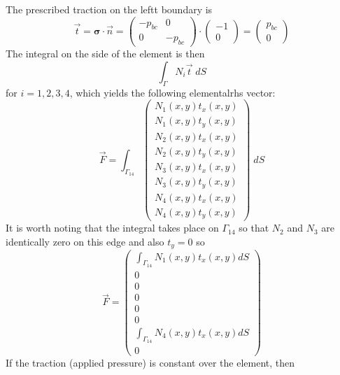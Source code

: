 The prescribed traction on the leftt boundary is
\[
{\vec t}={\bm \sigma}\cdot {\vec n}=
\left(
\begin{array}{cc}
-p_{bc} & 0 \\
0 & -p_{bc}
\end{array}
\right)
\cdot
\left(
\begin{array}{c}
-1 \\ 0
\end{array}
\right)
=
\left(
\begin{array}{c}
p_{bc} \\ 0
\end{array}
\right)
\]
The integral on the side of the element is then 
\[
\int_\Gamma N_i {\vec t} \; dS
\]
for $i=1,2,3,4$, which yields the following elementalrhs vector:
\[
\vec{F}=
\int_{\Gamma_{14}} 
\left(
\begin{array}{c}
N_1(x,y) t_x(x,y)\\
N_1(x,y) t_y(x,y)\\
N_2(x,y) t_x(x,y)\\
N_2(x,y) t_y(x,y)\\
N_3(x,y) t_x(x,y)\\
N_3(x,y) t_y(x,y)\\
N_4(x,y) t_x(x,y)\\
N_4(x,y) t_y(x,y)
\end{array}
\right)
\; dS
\]
It is worth noting that the integral takes place on $\Gamma_{14}$ 
so that $N_2$ and $N_3$ are identically zero on this edge
and also $t_y=0$ 
so 
\[
\vec{F}=
\left(
\begin{array}{c}
\int_{\Gamma_{14}}  N_1(x,y) t_x(x,y) dS\\
0 \\
0 \\ 0 \\ 0 \\ 0 \\
\int_{\Gamma_{14}} N_4(x,y) t_x(x,y) dS\\
0
\end{array}
\right)
\]
If the traction (applied pressure) is constant over the element, 
then  
